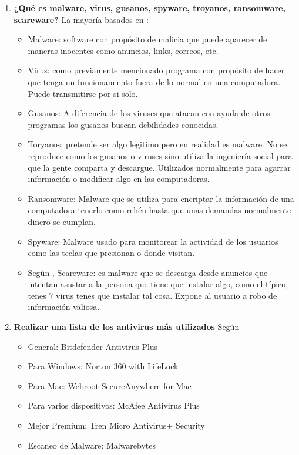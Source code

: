 \documentclass[stu, 12pt, letterpaper, donotrepeattitle, floatsintext, natbib, helv]{apa7}
\begin{document}
\begin{enumerate}
    \item \textbf{¿Qué es malware, virus, gusanos, spyware, troyanos, ransomware, scareware?} 
    La mayoría basados en \cite{malwareTypes1}:
    \begin{itemize}
        \item Malware: software con propósito de malicia que puede aparecer de maneras inocentes como anuncios, links, correos, etc.
        \item Virus: como previamente mencionado programa con propósito de hacer que tenga un funcionamiento fuera de lo normal en una computadora. Puede transmitirse por si solo.
        \item Gusanos: A diferencia de los viruses que atacan con ayuda de otros programas los gusanos buscan debilidades conocidas.
        \item Toryanos: pretende ser algo legitimo pero en realidad es malware. No se reproduce como los gusanos o viruses sino utiliza la ingeniería social para que la gente comparta y descargue. Utilizados normalmente para agarrar información o modificar algo en las computadoras.
        \item Ransomware: Malware que se utiliza para encriptar la información de una computadora tenerlo como rehén hasta que unas demandas normalmente dinero se cumplan.
        \item Spyware: Malware usado para monitorear la actividad de los usuarios como las teclas que presionan o donde visitan.
        \item Según \cite{scareware}, Scareware: es malware que se descarga desde anuncios que intentan asustar a la persona que tiene que instalar algo, como el típico, tenes 7 virus tenes que instalar tal cosa. Expone al usuario a robo de información valiosa.
    \end{itemize}
    
    
    \item \textbf{Realizar una lista de los antivirus más utilizados}
    Según \cite{antivirus}
    \begin{itemize}
        \item General: Bitdefender Antivirus Plus
        \item Para Windows: Norton 360 with LifeLock
        \item Para Mac: Webroot SecureAnywhere for Mac
        \item Para varios dispositivos: McAfee Antivirus Plus
        \item Mejor Premium: Tren Micro Antivirus+ Security
        \item Escaneo de Malware: Malwarebytes
    \end{itemize}
    

\end{enumerate}
\end{document}
